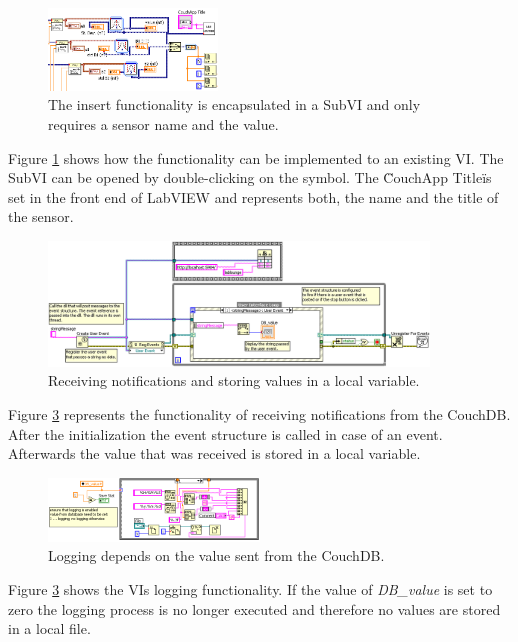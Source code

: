 \begin{figure}[h!]
  \centering
      \includegraphics[width=0.4\textwidth]{images/VIExample.png}
  \caption{The insert functionality is encapsulated in a SubVI and only requires a sensor name and the value.}
  \label{figure:ExampleVI}
\end{figure}

Figure \ref{figure:ExampleVI} shows how the functionality can be implemented to an existing VI. The SubVI can be opened by double-clicking on the symbol. The \"CouchApp Title\" is set in the front end of LabVIEW and represents both, the name and the title of the sensor. \\

\begin{figure}[h!]
  \centering
      \includegraphics[width=0.9\textwidth]{images/VIExample_notification2.png}
  \caption{Receiving notifications and storing values in a local variable.}
  \label{figure:ExampleVI_receiving}
\end{figure}

Figure \ref{figure:ExampleVI_receiving} represents the functionality of receiving notifications from the CouchDB. After the initialization the event structure is called in case of an event. Afterwards the value that was received is stored in a local variable. \\

\begin{figure}[h!]
  \centering
      \includegraphics[width=0.5\textwidth]{images/VIExample_notification.png}
  \caption{Logging depends on the value sent from the CouchDB.}
  \label{figure:ExampleVI_receiving}
\end{figure}

Figure \ref{figure:ExampleVI_receiving} shows the VIs logging functionality. If the value of \textit{DB\_value} is set to zero the logging process is no longer executed and therefore no values are stored in a local file.  \\